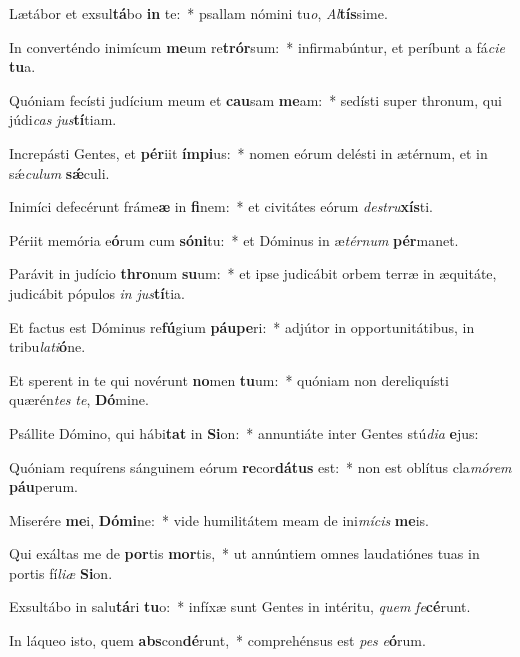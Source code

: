 \item Lætábor et exsul\textbf{tá}bo \textbf{in} te:~* psallam nómini tu\textit{o}, \textit{Al}\textbf{tís}sime.
\item In converténdo inimícum \textbf{me}um re\textbf{trór}sum:~* infirmabúntur, et períbunt a fá\textit{ci}\textit{e} \textbf{tu}a.
\item Quóniam fecísti judícium meum et \textbf{cau}sam \textbf{me}am:~* sedísti super thronum, qui júdi\textit{cas} \textit{jus}\textbf{tí}tiam.
\item Increpásti Gentes, et \textbf{pér}iit \textbf{ím}\textbf{pi}us:~* nomen eórum delésti in ætérnum, et in sǽ\textit{cu}\textit{lum} \textbf{sǽ}culi.
\item Inimíci defecérunt fráme\textbf{æ} in \textbf{fi}nem:~* et civitátes eórum \textit{de}\textit{stru}\textbf{xís}ti.
\item Périit memória e\textbf{ó}rum cum \textbf{só}\textbf{ni}tu:~* et Dóminus in æ\textit{tér}\textit{num} \textbf{pér}manet.
\item Parávit in judício \textbf{thro}num \textbf{su}um:~* et ipse judicábit orbem terræ in æquitáte, judicábit pópulos \textit{in} \textit{jus}\textbf{tí}tia.
\item Et factus est Dóminus re\textbf{fú}gium \textbf{páu}\textbf{pe}ri:~* adjútor in opportunitátibus, in tribu\textit{la}\textit{ti}\textbf{ó}ne.
\item Et sperent in te qui novérunt \textbf{no}men \textbf{tu}um:~* quóniam non dereliquísti quærén\textit{tes} \textit{te}, \textbf{Dó}mine.
\item Psállite Dómino, qui hábi\textbf{tat} in \textbf{Si}on:~* annuntiáte inter Gentes stú\textit{di}\textit{a} \textbf{e}jus:
\item Quóniam requírens sánguinem eórum \textbf{re}cor\textbf{dá}\textbf{tus} est:~* non est oblítus cla\textit{mó}\textit{rem} \textbf{páu}perum.
\item Miserére \textbf{me}i, \textbf{Dó}\textbf{mi}ne:~* vide humilitátem meam de ini\textit{mí}\textit{cis} \textbf{me}is.
\item Qui exáltas me de \textbf{por}tis \textbf{mor}tis,~* ut annúntiem omnes laudatiónes tuas in portis fí\textit{li}\textit{æ} \textbf{Si}on.
\item Exsultábo in salu\textbf{tá}ri \textbf{tu}o:~* infíxæ sunt Gentes in intéritu, \textit{quem} \textit{fe}\textbf{cé}runt.
\item In láqueo isto, quem \textbf{abs}con\textbf{dé}runt,~* comprehénsus est \textit{pes} \textit{e}\textbf{ó}rum.
